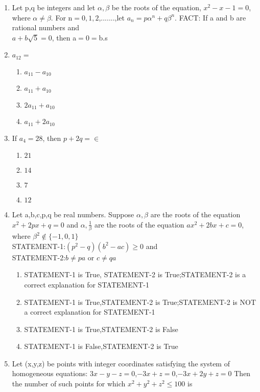 \begin{enumerate}[label=\arabic*.,ref=\thesubsection.\theenumi]
\item Let p,q be integers and let $\alpha,\beta$ be the roots of the equation, $x^2-x-1=0$, where $\alpha\neq\beta$. For n$=0,1,2$,.......,let $a_n=p\alpha^n+q\beta^n$.
FACT: If a and b are rational numbers and \\$a+b\sqrt5=0$, then a$=0=$b.s

\item $a_{12} =$
\begin{enumerate}
\item $a_{11}-a_{10}$
\item $a_{11}+a_{10}$ 
\item $2a_{11}+a_{10}$
\item $a_{11}+2a_{10}$
\end{enumerate}

\item If $a_4 =28$, then $p+2q=\in$
\begin{enumerate}
\item $21$
\item $14$ 
\item $7$
\item $12$ 
\end{enumerate}

\item Let a,b,c,p,q be real numbers. Suppose $\alpha,\beta$ are the roots of the equation $x^2+2px+q=0$ and $\alpha, \frac{1}{\beta}$ are the roots of the equation $ax^2 +2bx+c=0$, where $\beta^2{\notin\lbrace-1,0,1\rbrace}$\\
         STATEMENT-1:$(p^2-q)(b^2-ac)\geq0$
          and\\
         STATEMENT-2:$b\neq{pa}$ or $c\neq{qa}$
\begin{enumerate}
\item STATEMENT-1 is True, STATEMENT-2 is True;STATEMENT-2 is a correct explanation for STATEMENT-1
\item STATEMENT-1 is True,STATEMENT-2 is True;STATEMENT-2 is NOT a correct explanation for STATEMENT-1
\item STATEMENT-1 is True,STATEMENT-2 is False
\item STATEMENT-1 is False,STATEMENT-2 is True
\end{enumerate}

\item Let (x,y,z) be points with integer coordinates satisfying the system of homogeneous equations:
$3x-y-z=0$,$-3x+z=0$,$-3x+2y+z=0$ Then the number of such points for which $x^2+y^2+z^2\leq100$ is


\end{enumerate}
